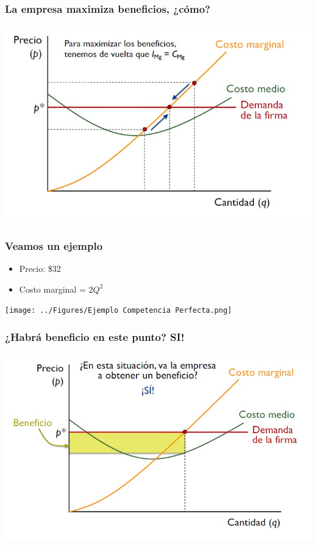 \documentclass{beamer}
\begin{document}
\begin{frame}
\frametitle{La empresa maximiza beneficios, ¿cómo?}
\includegraphics[scale=0.55]{../Figures/Tema_07.10_compperfecta4.jpg}
\end{frame}

\begin{frame}
\frametitle{Veamos un ejemplo}
\begin{itemize}
    \item Precio: \$32
    \item Costo marginal = $2Q^{2}$
\end{itemize}
\centering
\texttt{[image: ../Figures/Ejemplo Competencia Perfecta.png]}
\end{frame}

\begin{frame}
\frametitle{¿Habrá beneficio en este punto? SI!}
\includegraphics[scale=0.55]{../Figures/Tema_07.11_compperfecta5.jpg}
\end{frame}
\end{document}
